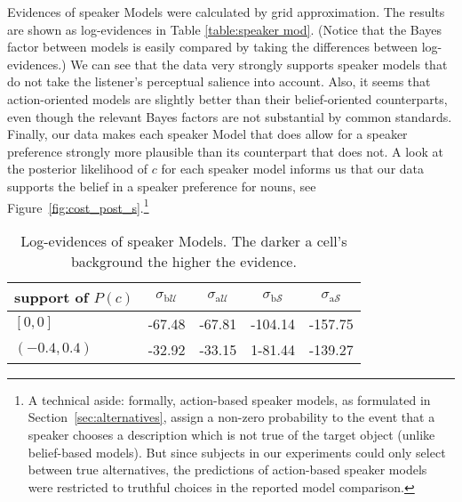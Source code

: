 Evidences of speaker Models were calculated by grid approximation. The
results are shown as log-evidences in Table \ref{table:speaker
  mod}. (Notice that the Bayes factor between models is easily
compared by taking the differences between log-evidences.) We can see
that the data very strongly supports speaker models that do not take
the listener's perceptual salience into account. Also, it seems that
action-oriented models are slightly better than their belief-oriented
counterparts, even though the relevant Bayes factors are not
substantial by common standards. Finally, our data makes each speaker
Model that does allow for a speaker preference strongly more plausible
than its counterpart that does not. A look at the posterior likelihood
of $c$ for each speaker model informs us that our data supports the
belief in a speaker preference for nouns, see
Figure~\ref{fig:cost_post_s}.\footnote{\label{fn:truth-restriction-S}A
  technical aside: formally, action-based speaker models, as
  formulated in Section~\ref{sec:alternatives}, assign a non-zero
  probability to the event that a speaker chooses a description which
  is not true of the target object (unlike belief-based models). But
  since subjects in our experiments could only select between true
  alternatives, the predictions of action-based speaker models were
  restricted to truthful choices in the reported model comparison.}
%
\begin{table}[htb] 
  \centering 
  \caption{Log-evidences of speaker Models. The darker a cell's
    background the higher the evidence.}
  \begin{tabular}{lcccc}
    support of $P(c)$ 
    & $\sigma_{\mathrm{b}\mathcal{U}}$
    & $\sigma_{\mathrm{a}\mathcal{U}}$
    & $\sigma_{\mathrm{b}\mathcal{S}}$
    & $\sigma_{\mathrm{a}\mathcal{S}}$
    \\ \midrule
    $[0,0]$
    & \cellcolor{lightgray!72} -67.48 
    & \cellcolor{lightgray!72}  -67.81 
    & \cellcolor{lightgray!43} -104.14 
    & \cellcolor{lightgray!0} -157.75
    \\
    $(-0.4,0.4)$
    & \cellcolor{lightgray!100} -32.92 
    & \cellcolor{lightgray!99} -33.15  
    & \cellcolor{lightgray!61} \textcolor{lightgray!61}{1}-81.44 
    & \cellcolor{lightgray!15} -139.27
  \end{tabular} 
  \label{table:speaker mod}
\end{table}
%
